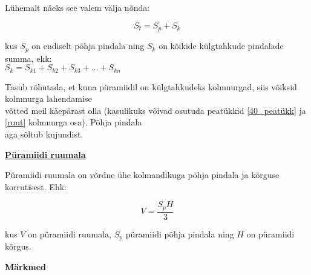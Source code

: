 \begin{center}
{{{\begin{flushleft}
\vspace{2mm}
\hspace{5mm}
Lühemalt näeks see valem välja nõnda:

\begin{equation}
\label{42_eq2}
\boxed{S_{t}=S_{p}+S_{k}}
\end{equation}

\hspace{5mm}
kus $S_{p}$ on endiselt põhja pindala ning $S_{k}$ on kõikide külgtahkude pindalade summa, ehk:\\ \hspace{5mm} $S_{k}=S_{k1}+S_{k2}+S_{k3}+...+S_{kn}$

\vspace{2mm}
\hspace{5mm}
Tasub rõhutada, et kuna püramiidil on külgtahkudeks kolmnurgad, siis võiksid kolmnurga lahendamise\\ \hspace{5mm} võtted meil käepärast olla (kasulikuks võivad osutuda peatükkid \ref{40_peatükk} ja \ref{ruut} kolmnurga osa). Põhja pindala\\ \hspace{5mm} aga sõltub kujundist.

\vspace{2mm}
\hspace{5mm}
\textbf{\underline{Püramiidi ruumala}}

\vspace{2mm}
\hspace{5mm}
Püramiidi ruumala on võrdne ühe kolmandikuga põhja pindala ja kõrguse korrutisest. Ehk:

\begin{equation}
\label{42_eq3}
\boxed{V=\dfrac{S_{p}H}{3}}
\end{equation}

\hspace{5mm}
kus $V$ on püramiidi ruumala, $S_{p}$ püramiidi põhja pindala ning $H$ on püramiidi kõrgus.
\end{flushleft}
}}}
\end{center}

\pagebreak
\vspace{0.5cm}

\textbf{Märkmed}\\
\vspace{2mm}
\begin{mdframed}[style=graphpaper]
\vspace{20cm}
\end{mdframed}